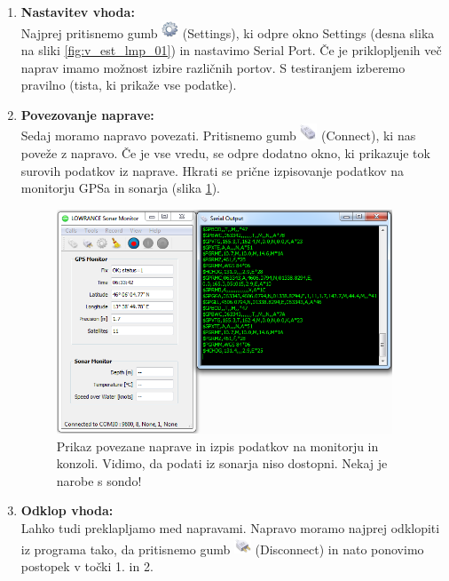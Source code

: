 \begin{enumerate}
	\item \textbf{Nastavitev vhoda:}\\[1mm]
	Najprej pritisnemo gumb  \includegraphics[width=5mm]{Vaje/KartGlobSlan/figs/icons/settings.png} (Settings), ki odpre okno Settings (desna slika na sliki \ref{fig:v_est_lmp_01}) in nastavimo Serial Port. Če je priklopljenih več naprav imamo možnost izbire različnih portov. S testiranjem izberemo pravilno (tista, ki prikaže vse podatke).\\[2mm]
	
	\item \textbf{Povezovanje naprave:}\\[1mm]
	Sedaj moramo napravo povezati. Pritisnemo gumb \includegraphics[width=5mm]{Vaje/KartGlobSlan/figs/icons/connect.png} (Connect), ki nas poveže z napravo. Če je vse vredu, se odpre dodatno okno, ki prikazuje tok surovih podatkov iz naprave. Hkrati se prične izpisovanje podatkov na monitorju GPSa in sonarja (slika \ref{fig:v_est_lmp_02}).\\[2mm]
	
	\begin{figure}[!h]
		\centering \includegraphics[width=10cm]{Vaje/KartGlobSlan/figs/connected.png}
		\caption{Prikaz povezane naprave in izpis podatkov na monitorju in konzoli.  Vidimo, da podati iz sonarja niso dostopni. Nekaj je narobe s sondo!}
		\label{fig:v_est_lmp_02}
	\end{figure}
	
	\item \textbf{Odklop vhoda:}\\[1mm]
	Lahko tudi preklapljamo med napravami. Napravo moramo najprej odklopiti iz  programa tako, da pritisnemo gumb \includegraphics[width=5mm]{Vaje/KartGlobSlan/figs/icons/disconnect.png} (Disconnect) in nato ponovimo postopek v točki 1. in 2.\\[2mm]
	

\end{enumerate}
